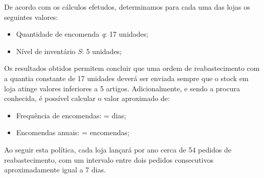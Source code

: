 De acordo com os cálculos efetudos, determinamos para cada uma das lojas os seguintes valores:

\begin{itemize}
\item Quantidade de encomenda \emph{q}: 17 unidades;
\item Nível de inventário \emph{S}: 5 unidades;
\end{itemize}

Os resultados obtidos permitem concluir que uma ordem de reabastecimento com a quantia constante de 17 unidades deverá ser enviada sempre que o stock em loja atinge valores inferiores a 5 artigos. Adicionalmente, e sendo a procura conhecida, é possível calcular o valor aproximado de:

\begin{itemize}
\item Frequência de encomendas:  =   dias;
\item Encomendas anuais:  =   encomendas;
\end{itemize}

Ao seguir esta política, cada loja lançará por ano cerca de 54 pedidos de reabastecimento, com um intervalo entre dois pedidos consecutivos aproximadamente igual a 7 dias.   



